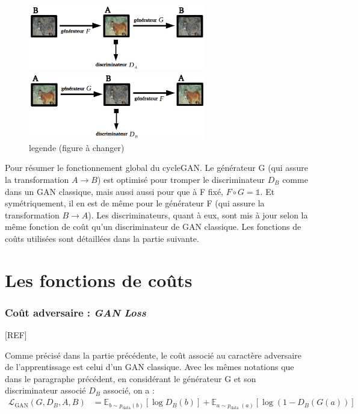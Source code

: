 \begin{figure}[!h]
\centering
\includegraphics[width=220pt]{"images/cycleBack"}

\vspace{6mm}

\includegraphics[width=220pt]{"images/cycleFor"}
\caption{legende (figure à changer)}
\end{figure}

Pour résumer le fonctionnement global du cycleGAN. Le générateur G (qui assure la transformation $ A \rightarrow B $) est optimisé pour tromper le discriminateur $ D_B $ comme dans un GAN classique, mais aussi aussi pour que à F fixé, $ F \circ G = \mathbb{1} $. Et symétriquement, il en est de même pour le générateur F (qui assure la transformation $ B \rightarrow A $). Les discriminateurs, quant à eux, sont mis à jour selon la même fonction de coût qu'un discriminateur de GAN classique. Les fonctions de coûts utilisées sont détaillées dans la partie suivante.


\section{Les fonctions de coûts}

\subsubsection{Coût adversaire : \textit{GAN Loss}}

[REF]

Comme précisé dans la partie précédente, le coût associé au caractère adversaire de l'apprentissage est celui d'un GAN classique. Avec les mêmes notations que dans le paragraphe précédent, en considérant le générateur G et son discriminateur associé $D_B$ associé, on a :
$$\begin{aligned}
\mathcal{L}_{\mathrm{GAN}}\left(G, D_{B}, A, B\right) &=\mathbb{E}_{b \sim p_{\mathrm{data}}(b)}\left[\log D_{B}(b)\right] +\mathbb{E}_{a \sim p_{\text {data }}(a)}\left[\log \left(1-D_{B}(G(a))\right]\right.
\end{aligned}$$

